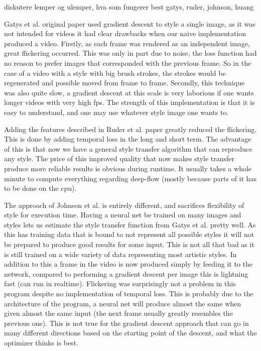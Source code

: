 diskutere lemper og ulemper, hva som fungerer best
gatys, ruder, johnson, huang \medskip

Gatys et al. \cite{Gatys:1} original paper used gradient descent to style a single image, as it was not intended for videos it had clear drawbacks when our naive implementation produced a video. Firstly, as each frame was rendered as an independent image, great flickering occurred. This was only in part due to noise, the loss function had no reason to prefer images that corresponded with the previous frame. So in the case of a video with a style with big brush strokes, the strokes would be regenerated and possible moved from frame to frame. Secondly, this technique was also quite slow, a gradient descent at this scale is very laborious if one wants longer videos with very high fps. The strength of this implementation is that it is easy to understand, and one may use whatever style image one wants to. 

\medskip

Adding the features described in Ruder et al. \cite{Ruder:1} paper greatly reduced the flickering. This is done by adding temporal loss in the long and short term. The advantage of this is that now we have a general style transfer algorithm that can reproduce any style. The price of this improved quality that now makes style transfer produce more reliable results is obvious during runtime. It usually takes a whole minute to compute everything regarding deep-flow (mostly because parts of it has to be done on the cpu).

\medskip

The approach of Johnson et al. \cite{Johnson:1} is entirely different, and sacrifices flexibility of style for execution time. Having a neural net be trained on many images and styles lets us estimate the style transfer function from Gatys et al. \cite{Gatys:1} pretty well. As this has training data that is bound to not represent all possible styles it will not be prepared to produce good results for some input. This is not all that bad as it is still trained on a wide variety of data representing most artistic styles. In addition to this a frame in the video is now produced simply by feeding it to the network, compared to performing a gradient descent per image this is lightning fast (can run in realtime). Flickering was surprisingly not a problem in this program despite no implementation of temporal loss. This is probably due to the architecture of the program, a neural net will produce almost the same when given almost the same input (the next frame usually greatly resembles the previous one). This is not true for the gradient descent approach that can go in many different directions based on the starting point of the descent, and what the optimizer thinks is best. 

